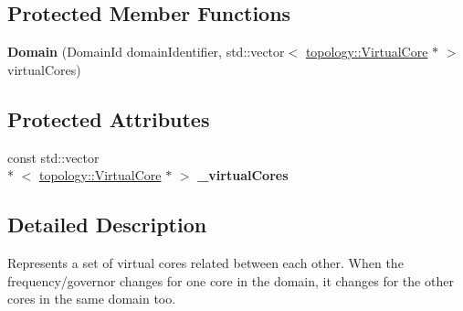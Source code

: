 \subsection*{Protected Member Functions}
\begin{DoxyCompactItemize}
\item 
\hypertarget{classmammut_1_1cpufreq_1_1Domain_a7c5ae0a8f2109fa0adfcf891e6696b0f}{{\bfseries Domain} (Domain\-Id domain\-Identifier, std\-::vector$<$ \hyperlink{classmammut_1_1topology_1_1VirtualCore}{topology\-::\-Virtual\-Core} $\ast$ $>$ virtual\-Cores)}\label{classmammut_1_1cpufreq_1_1Domain_a7c5ae0a8f2109fa0adfcf891e6696b0f}

\end{DoxyCompactItemize}
\subsection*{Protected Attributes}
\begin{DoxyCompactItemize}
\item 
\hypertarget{classmammut_1_1cpufreq_1_1Domain_ae71a3d8c629d75fab1a6cf313e445d3c}{const std\-::vector\\*
$<$ \hyperlink{classmammut_1_1topology_1_1VirtualCore}{topology\-::\-Virtual\-Core} $\ast$ $>$ {\bfseries \-\_\-virtual\-Cores}}\label{classmammut_1_1cpufreq_1_1Domain_ae71a3d8c629d75fab1a6cf313e445d3c}

\end{DoxyCompactItemize}


\subsection{Detailed Description}
Represents a set of virtual cores related between each other. When the frequency/governor changes for one core in the domain, it changes for the other cores in the same domain too. 

